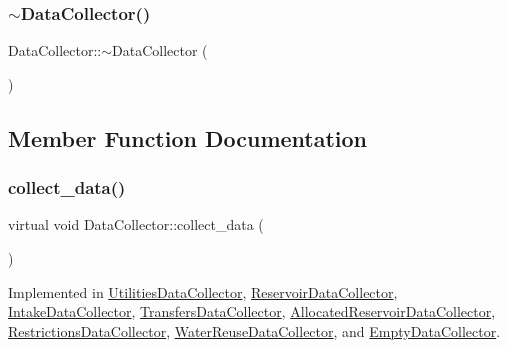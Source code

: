 \mbox{\label{classDataCollector_a9f9ff1817bd0601ba33925c3378ac50e_a9f9ff1817bd0601ba33925c3378ac50e}} 
\subsubsection{\texorpdfstring{$\sim$\+Data\+Collector()}{~DataCollector()}}
{\footnotesize\ttfamily Data\+Collector\+::$\sim$\+Data\+Collector (\begin{DoxyParamCaption}{ }\end{DoxyParamCaption})\hspace{0.3cm}{\ttfamily [virtual]}}



\subsection{Member Function Documentation}
\mbox{\label{classDataCollector_a01486bf58acbe37b203f97b3b9a79c40_a01486bf58acbe37b203f97b3b9a79c40}} 
\subsubsection{\texorpdfstring{collect\+\_\+data()}{collect\_data()}}
{\footnotesize\ttfamily virtual void Data\+Collector\+::collect\+\_\+data (\begin{DoxyParamCaption}{ }\end{DoxyParamCaption})\hspace{0.3cm}{\ttfamily [pure virtual]}}



Implemented in \mbox{\hyperlink{classUtilitiesDataCollector_ab72c4432d6816beb1f4f4b354fb3023d_ab72c4432d6816beb1f4f4b354fb3023d}{Utilities\+Data\+Collector}}, \mbox{\hyperlink{classReservoirDataCollector_a5c2e1355c40e45b409168e98245eef95_a5c2e1355c40e45b409168e98245eef95}{Reservoir\+Data\+Collector}}, \mbox{\hyperlink{classIntakeDataCollector_aed1610e5419465b35041b05b9f60c212_aed1610e5419465b35041b05b9f60c212}{Intake\+Data\+Collector}}, \mbox{\hyperlink{classTransfersDataCollector_a2f5c4427699aab547ea0d3b74993752b_a2f5c4427699aab547ea0d3b74993752b}{Transfers\+Data\+Collector}}, \mbox{\hyperlink{classAllocatedReservoirDataCollector_a8ef8451d2cc6eb01b205eee75ab93729_a8ef8451d2cc6eb01b205eee75ab93729}{Allocated\+Reservoir\+Data\+Collector}}, \mbox{\hyperlink{classRestrictionsDataCollector_a7d8b6433ec25a53ed50577c2cf89912d_a7d8b6433ec25a53ed50577c2cf89912d}{Restrictions\+Data\+Collector}}, \mbox{\hyperlink{classWaterReuseDataCollector_af4d8d437372c06d84ff889a5288cc96e_af4d8d437372c06d84ff889a5288cc96e}{Water\+Reuse\+Data\+Collector}}, and \mbox{\hyperlink{classEmptyDataCollector_a2993f4e00acd2eff18bed2e39108e89f_a2993f4e00acd2eff18bed2e39108e89f}{Empty\+Data\+Collector}}.

